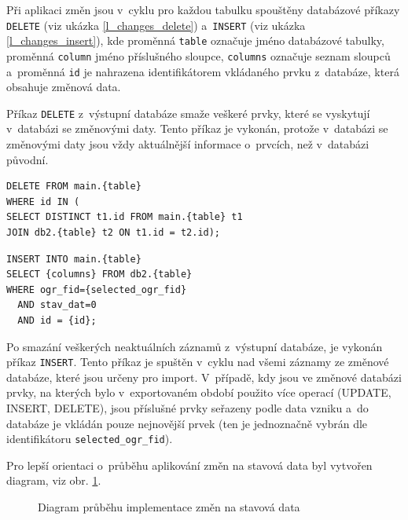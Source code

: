 \documentclass[a4paper,12pt,oneside]{book}
\begin{document}
Při aplikaci změn jsou v~cyklu pro každou tabulku spouštěny databázové
příkazy \texttt{DELETE} (viz ukázka \ref{l_changes_delete})
a~\texttt{INSERT} (viz ukázka \ref{l_changes_insert}), kde proměnná
\texttt{table} označuje jméno databázové tabulky, proměnná
\texttt{column} jméno příslušného sloupce, \texttt{columns} označuje
seznam sloupců a~proměnná \texttt{id} je nahrazena identifikátorem
vkládaného prvku z~databáze, která obsahuje změnová data.

Příkaz \texttt{DELETE} z~výstupní databáze smaže veškeré prvky, které se
vyskytují v~databázi se změnovými daty. Tento příkaz je vykonán,
protože v~databázi se změnovými daty jsou vždy aktuálnější informace
o~prvcích, než v~databázi původní.

{\scriptsize
\begin{lstlisting}[style=sql, caption={Aplikace změn -- příkaz DELETE}, 
		    label=l_changes_delete]
DELETE FROM main.{table}
WHERE id IN (
SELECT DISTINCT t1.id FROM main.{table} t1
JOIN db2.{table} t2 ON t1.id = t2.id);
\end{lstlisting}

\begin{lstlisting}[style=sql, 
		    caption={Aplikace změn -- příkaz INSERT}, 
		    label=l_changes_insert]
INSERT INTO main.{table}
SELECT {columns} FROM db2.{table}
WHERE ogr_fid={selected_ogr_fid}
  AND stav_dat=0
  AND id = {id};
\end{lstlisting}
}

Po smazání veškerých neaktuálních záznamů z~výstupní databáze, je
vykonán příkaz \texttt{INSERT}. Tento příkaz je spuštěn v~cyklu nad
všemi záznamy ze změnové databáze, které jsou určeny pro
import. V~případě, kdy jsou ve změnové databázi prvky, na kterých bylo
v~exportovaném období použito více operací (UPDATE, INSERT, DELETE),
jsou příslušné prvky seřazeny podle data vzniku a~do databáze je
vkládán pouze nejnovější prvek (ten je jednoznačně vybrán dle
identifikátoru \texttt{selected\_ogr\_fid}).

Pro lepší orientaci o~průběhu aplikování změn na stavová data byl
vytvořen diagram, viz obr. \ref{l_zmeny_diagram}.

\begin{figure}
  \centering
  
  \caption{Diagram průběhu implementace změn na stavová data}
  \label{l_zmeny_diagram}
\end{figure}
\end{document}
